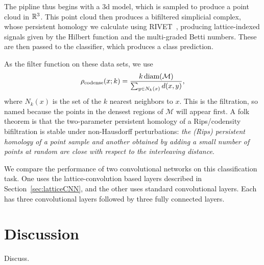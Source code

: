 \documentclass{article}
\begin{document}
The pipline thus begins with a 3d model, which is sampled to produce a point
cloud in $\mathbb{R}^3$. This point cloud then produces a bifiltered simplicial complex,
whose persistent homology we calculate using RIVET~\cite{lesnick_interactive_2015}, producing
lattice-indexed signals given by the Hilbert function and the multi-graded Betti
numbers. These are then passed to the classifier, which produces a class prediction.

As the filter function on these data sets, we use
\[\rho_{\text{codense}}(x;k) = \frac{k \operatorname{diam}(\mathcal M)}{\sum_{y \in N_k(x)}
    d(x,y)},\]
where $N_k(x)$ is the set of the $k$ nearest neighbors to $x$. This is the
 filtration, so named because the points in the densest
regions of $\mathcal M$ will appear first. A folk theorem is that the
two-parameter persistent homology of a Rips/codensity bifiltration is stable
under non-Hausdorff perturbations: \textit{the (Rips) persistent homology of a
  point sample and another obtained by adding a small number of points at random
are close with respect to the interleaving distance}.

We compare the performance of two convolutional networks on this classification
task. One uses the lattice-convolution based layers described in
Section~\ref{sec:latticeCNN}, and the other uses standard convolutional layers.
Each has three convolutional layers followed by three fully connected layers.




\section{Discussion}
Discuss.




\end{document}

